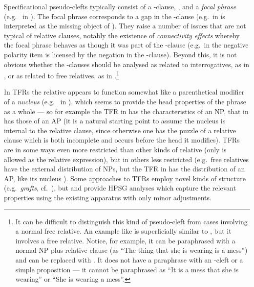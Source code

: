 \documentclass[output=paper,biblatex,babelshorthands,newtxmath,draftmode,colorlinks,citecolor=brown]{langscibook}
\begin{document}
\largerpage
Specificational pseudo-clefts typically consist of a -clause, , and a
\emph{focal phrase} (e.g.\  in ). The focal phrase corresponds to a
gap in the -clause (e.g.\ in   is interpreted as the
missing object of ). They raise a number of issues that are not typical of
relative clauses, notably the existence of \emph{connectivity effects} whereby the focal
phrase behaves as though it was part of the -clause (e.g.\ in  the
negative polarity item  is licensed by the negation in the
-clause). Beyond this, it is not obvious whether the -clauses should be
analysed as related to interrogatives, as in , or as related to free
relatives, as in .\footnote{It can be
  difficult to distinguish this kind 
  of pseudo-cleft from cases involving a normal free relative. An example like  is superficially similar to , but it involves a
  free relative. Notice, for example, it can be paraphrased with a normal NP plus relative
  clause (as ``The thing that she is wearing is a mess'') and  can be replaced
  with . It does not have a paraphrase with an -cleft or a simple
  proposition --- it cannot be paraphrased as ``It is a mess that she is wearing'' or ``She is
  wearing a mess''.}

In TFRs the relative appears to function somewhat like a parenthetical modifier of a
\emph{nucleus} (e.g.\  in ), which seems to provide the head
properties of the phrase as a whole --- so for example the TFR in  has the
characteristics of an NP, that in  has those of an AP (it is a natural starting
point to assume the nucleus is internal to the relative clause, since otherwise one has
the puzzle of a relative clause which is both incomplete and occurs before the head it
modifies). TFRs are in some ways even more restricted than other kinds of relative (only
 is allowed as the relative expression), but in others less restricted (e.g.\
free relatives
have the external distribution of NPs, but the TFR in  has the distribution of
an AP, like its nucleus \lic{belligerent}). Some approaches to TFRs employ novel kinds of
structure (e.g.\ \emph{grafts}, cf.\ \citealt{Riemskijk06Grafts}), but \citet{Yoo:08} and 
\citet{kim2011engtranspfrs} provide HPSG analyses which capture the relevant properties
using the existing apparatus with only minor adjustments.
\end{document}
